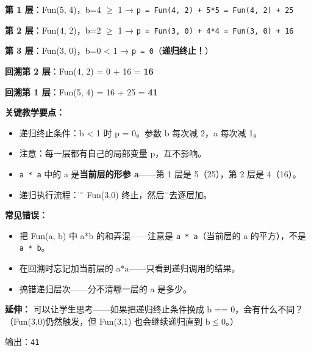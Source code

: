 \noindent \textbf{第 1 层}：Fun(5, 4)，b=4 $\geq$ 1 → \texttt{p = Fun(4, 2) + 5*5 = Fun(4, 2) + 25}

\noindent \textbf{第 2 层}：Fun(4, 2)，b=2 $\geq$ 1 → \texttt{p = Fun(3, 0) + 4*4 = Fun(3, 0) + 16}

\noindent \textbf{第 3 层}：Fun(3, 0)，b=0 < 1 → \texttt{p = 0}（\textbf{递归终止！}）

\noindent \textbf{回溯第 2 层}：Fun(4, 2) = 0 + 16 = \textbf{16}

\noindent \textbf{回溯第 1 层}：Fun(5, 4) = 16 + 25 = \textbf{41}

\medskip
\textbf{关键教学要点：}
\begin{itemize}
    \item 递归终止条件：b < 1 时 p = 0。参数 b 每次减 2，a 每次减 1。
    \item 注意：每一层都有自己的局部变量 p，互不影响。
    \item \texttt{a * a} 中的 a 是\textbf{当前层的形参 a}——第 1 层是 5（25），第 2 层是 4（16）。
    \item 递归执行流程：\"递\"到 Fun(3,0) 终止，然后\"归\"回去逐层加。
\end{itemize}

\textbf{常见错误：}
\begin{itemize}
    \item 把 Fun(a, b) 中 a*b 的和弄混——注意是 \texttt{a * a}（当前层的 a 的平方），不是 \texttt{a * b}。
    \item 在回溯时忘记加当前层的 a*a——只看到递归调用的结果。
    \item 搞错递归层次——分不清哪一层的 a 是多少。
\end{itemize}

\textbf{延伸：} 可以让学生思考——如果把递归终止条件换成 b == 0，会有什么不同？（Fun(3,0)仍然触发，但 Fun(3,1) 也会继续递归直到 b$\leq$0。）

{\color{highlight}输出：\texttt{41}}
